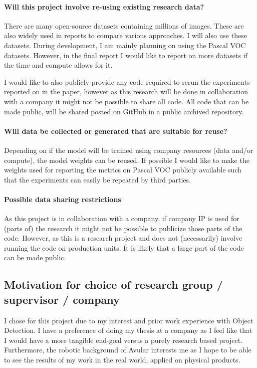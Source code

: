 \documentclass{article}
\begin{document}
\paragraph*{Will this project involve re-using existing research data?} There are many open-source datasets containing millions of images. These are also widely used in reports to compare various approaches. I will also use these datasets. During development, I am mainly planning on using the Pascal VOC \cite{hoiem2009pascal} datasets. However, in the final report I would like to report on more datasets if the time and compute allows for it.

I would like to also publicly provide any code required to rerun the experiments reported on in the paper, however as this research will be done in collaboration with a company it might not be possible to share all code. All code that can be made public, will be shared posted on GitHub in a public archived repository.

\paragraph*{Will data be collected or generated that are suitable for reuse?} Depending on if the model will be trained using company resources (data and/or compute), the model weights can be reused. If possible I would like to make the weights used for reporting the metrics on Pascal VOC publicly available such that the experiments can easily be repeated by third parties.

\paragraph*{Possible data sharing restrictions} As this project is in collaboration with a company, if company IP is used for (parts of) the research it might not be possible to publicize those parts of the code. However, as this is a research project and does not (necessarily) involve running the code on production units. It is likely that a large part of the code can be made public.


\subsection{Motivation for choice of research group / supervisor / company}

I chose for this project due to my interest and prior work experience with Object Detection. I have a preference of doing my thesis at a company as I feel like that I would have a more tangible end-goal versus a purely research based project. Furthermore, the robotic background of Avular interests me as I hope to be able to see the results of my work in the real world, applied on physical products.
\end{document}
